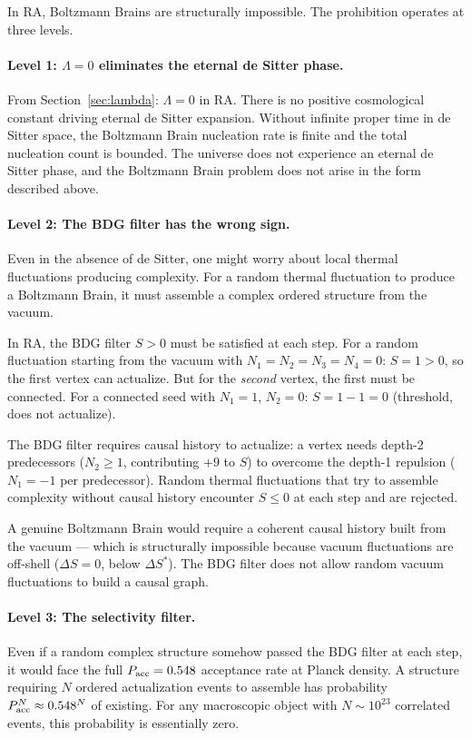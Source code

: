 \documentclass[12pt,a4paper]{article}
\begin{document}
In RA, Boltzmann Brains are structurally impossible.  The prohibition operates at three levels.

\paragraph{Level 1: $\Lambda=0$ eliminates the eternal de Sitter phase.}
From Section~\ref{sec:lambda}: $\Lambda=0$ in RA.  There is no positive cosmological constant driving eternal de Sitter expansion.  Without infinite proper time in de Sitter space, the Boltzmann Brain nucleation rate is finite and the total nucleation count is bounded.  The universe does not experience an eternal de Sitter phase, and the Boltzmann Brain problem does not arise in the form described above.

\paragraph{Level 2: The BDG filter has the wrong sign.}
Even in the absence of de Sitter, one might worry about local thermal fluctuations producing complexity.  For a random thermal fluctuation to produce a Boltzmann Brain, it must assemble a complex ordered structure from the vacuum.

In RA, the BDG filter $S>0$ must be satisfied at each step.  For a random fluctuation starting from the vacuum with $N_1=N_2=N_3=N_4=0$: $S=1>0$, so the first vertex can actualize.  But for the \emph{second} vertex, the first must be connected.  For a connected seed with $N_1=1$, $N_2=0$: $S=1-1=0$ (threshold, does not actualize).

The BDG filter requires causal history to actualize: a vertex needs depth-2 predecessors ($N_2\geq1$, contributing $+9$ to $S$) to overcome the depth-1 repulsion ($N_1=-1$ per predecessor).  Random thermal fluctuations that try to assemble complexity without causal history encounter $S\leq0$ at each step and are rejected.

A genuine Boltzmann Brain would require a coherent causal history built from the vacuum --- which is structurally impossible because vacuum fluctuations are off-shell ($\Delta S=0$, below $\Delta S^*$).  The BDG filter does not allow random vacuum fluctuations to build a causal graph.

\paragraph{Level 3: The selectivity filter.}
Even if a random complex structure somehow passed the BDG filter at each step, it would face the full $P_{\rm acc}=0.548$ acceptance rate at Planck density.  A structure requiring $N$ ordered actualization events to assemble has probability $P_{\rm acc}^N\approx0.548^N$ of existing.  For any macroscopic object with $N\sim10^{23}$ correlated events, this probability is essentially zero.
\end{document}
